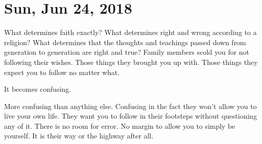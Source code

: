 \section{Sun, Jun 24, 2018}

What determines faith exactly? What determines right and wrong according to a
religion? What determines that the thoughts and teachings passed down from
generation to generation are right and true? Family members scold you for not
following their wishes. Those things they brought you up with. Those things they
expect you to follow no matter what.

It becomes confusing.

More confusing than anything else. Confusing in the fact they won't allow you to
live your own life. They want you to follow in their footsteps without
questioning any of it. There is no room for error. No margin to allow you to
simply be yourself. It is their way or the highway after all.
